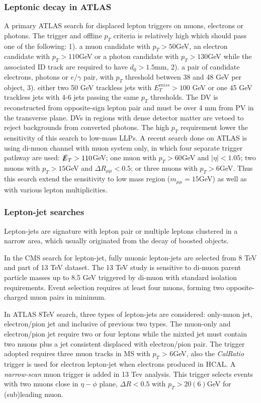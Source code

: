 \subsubsection{Leptonic decay in ATLAS}
 A primary ATLAS search for displaced lepton triggers on muons, electrons or photons. The trigger and offline $p_T$ criteria is relatively high which should pass one of the following: 1). a muon candidate with $p_T > 50$GeV, an electron candidate with $p_T >110$GeV or a photon candidate with $p_T > 130$GeV while the associated ID track are required to have $d_0 > 1.5$mm, 2). a pair of candidate electrons, photons or $e/\gamma$ pair, with $p_T$ threshold between 38 and 48 GeV per object, 3). either two 50 GeV trackless jets with $E_T^{miss} > 100$ GeV or one 45 GeV trackless jets with 4-6 jets passing the same $p_T$ thresholds.  The DV is reconstructed from opposite-sign lepton pair and must be over 4 mm from PV in the transverse plane. DVs in regions with dense detector matter are vetoed to reject backgrounds from converted photons. The high $p_T$ requirement lower the sensitivity of this search to low-mass LLPs.
  A recent search done on ATLAS is using di-muon channel with muon system only, in which four separate trigger pathway are used: $\slashed{E}_T > 110 $GeV; one muon with $p_T > 60$GeV and $|\eta|<1.05$; two muons with $p_T > 15$GeV and $\Delta R_{\mu\mu}<0.5$; or three muons with $p_T > 6$GeV. Thus this search extend the sensitivity to low mass region ($m_{\mu\mu}=15$GeV) as well as with various lepton multiplicities.

\subsubsection{Lepton-jet searches}
Lepton-jets are signature with lepton pair or multiple leptons clustered in a narrow area, which usually originated from the decay of boosted objects. 

In the CMS search for lepton-jet, fully muonic lepton-jets are selected from 8 TeV and part of 13 TeV dataset. The 13 TeV study is sensitive to di-muon parent particle masses up to 8.5 GeV triggered by di-muon with standard isolation requirements. Event selection requires at least four muons, forming two opposite-charged muon pairs in minimum. 

In ATLAS 8TeV search, three types of lepton-jets are considered: only-muon jet, electron/pion jet and inclusive of previous two types. The muon-only and electron/pion jet require two or four leptons while the mixted jet must contain two muons plus a jet consistent displaced with electron/pion pair. The trigger adopted requires three muon tracks in MS with $p_T$ > 6GeV, also the \textit{CalRatio} trigger is used for electron lepton-jet when electrons produced in HCAL. A \textit{narrow-scan} muon trigger is added in 13 Tev analysis. This trigger selects events with two muons close in $\eta-\phi$ plane, $\Delta R < 0.5$ with $p_T > 20(6)$GeV for (sub)leading muon. 

